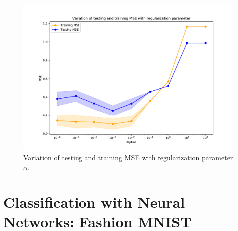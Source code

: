 \documentclass{article}
\begin{document}
\begin{figure}[!ht]
\centering
\includegraphics[width=\textwidth]{./Figures/1_2_mse.pdf}
\caption{Variation of testing and training MSE with regularization parameter $\alpha$.}
\label{1_2_mse}
\end{figure}

\clearpage
\section{Classification with Neural Networks: Fashion MNIST}

\end{document}
